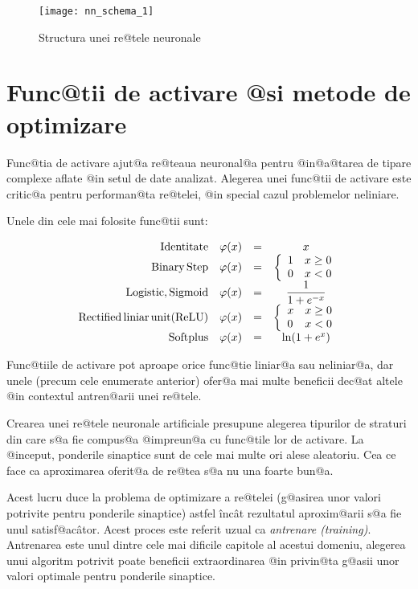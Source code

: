 \begin{figure}[h]
	\centering
	\texttt{[image: nn\_schema\_1]}
	\caption{Structura unei re@tele neuronale}
	\label{nn:schema}
\end{figure}




\section{Func@tii de activare @si metode de optimizare}
Func@tia de activare ajut@a re@teaua neuronal@a pentru @in@a@tarea de tipare complexe aflate @in setul de date analizat. Alegerea unei func@tii de activare este critic@a pentru performan@ta re@telei, @in special cazul problemelor neliniare.

Unele din cele mai folosite func@tii sunt:

$$
\begin{array}{rlcc}
	{\rm Identitate} & \varphi (x) &=& x \\
	{\rm Binary \, Step} & \varphi (x) &=& \left\lbrace
		\begin{array}{lc}
			1 & x \geq 0 \\
			0 & x < 0
		\end{array}
	\right. \\
	{\rm Logistic, Sigmoid} & \varphi (x) &=& \displaystyle\frac{1}{1 + e^{-x}} \\
	{\rm Rectified\, liniar\, unit (ReLU)}& \varphi (x) &=& \left\lbrace
		\begin{array}{lc}
			x & x \geq 0 \\
			0 & x < 0
		\end{array}
	\right. \\
	{\rm Softplus} & \varphi (x) &=& \ln ( 1 + e^x) \\
\end{array}
$$

Func@tiile de activare pot aproape orice func@tie liniar@a sau neliniar@a, dar unele  (precum cele enumerate anterior) ofer@a mai multe beneficii dec@at altele @in contextul antren@arii unei re@tele.

Crearea unei re@tele neuronale artificiale presupune alegerea tipurilor de straturi din care s@a fie compus@a @impreun@a cu func@tile lor de activare. La @inceput, ponderile sinaptice sunt de cele mai multe ori alese aleatoriu. Cea ce face ca aproximarea oferit@a de re@tea s@a nu una foarte bun@a.

Acest lucru duce la problema de optimizare a re@telei (g@asirea unor valori potrivite pentru ponderile sinaptice) astfel \^inc\^ at rezultatul aproxim@arii s@a fie unul satisf@ac\^ ator. Acest proces este referit uzual ca {\sl antrenare (training)}. Antrenarea este unul dintre cele mai dificile capitole al acestui domeniu, alegerea unui algoritm potrivit poate beneficii extraordinarea @in privin@ta g@asii unor valori optimale pentru ponderile sinaptice.

